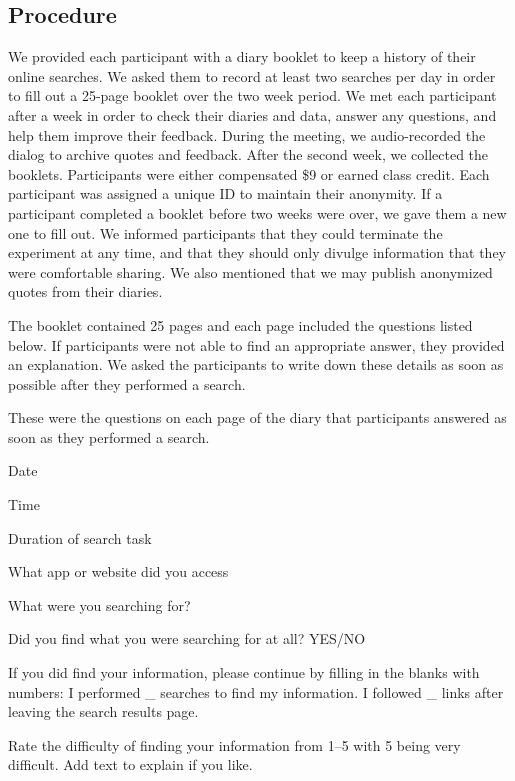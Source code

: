 \subsection{Procedure}
We provided each participant with a diary booklet to keep a history of their online searches.  We asked them to record at least two searches per day in order to fill out a 25-page booklet over the two week period. We met each participant after a week in order to check their diaries and data, answer any questions, and help them improve their feedback. During the meeting, we audio-recorded the dialog to archive quotes and feedback. After the second week, we collected the booklets. Participants were either compensated \$9 or earned class credit. Each participant was assigned a unique ID to maintain their anonymity. If a participant completed a booklet before two weeks were over, we gave them a new one to fill out. We informed participants that they could terminate the experiment at any time, and that they should only divulge information that they were comfortable sharing. We also mentioned that we may publish anonymized quotes from their diaries. 

The booklet contained 25 pages and each page included the questions listed below. If participants were not able to find an appropriate answer, they provided an explanation. We asked the participants to write down these details as soon as possible after they performed a search. 

These were the questions on each page of the diary that participants answered as soon as they performed a search.
\begin{tight_enumerate}
            \item Date
            \item Time
            \item Duration of search task 
            \item What app or website did you access
            \item What were you searching for?
            \item Did you find what you were searching for at all? YES/NO
            \item If you did find your information, please continue by filling in the blanks with numbers: I performed \_ searches to find my information. I followed \_ links after leaving the search results page.
            \item Rate the difficulty of finding your information from 1--5 with 5 being very difficult. Add text to explain if you like.
\end{tight_enumerate}


